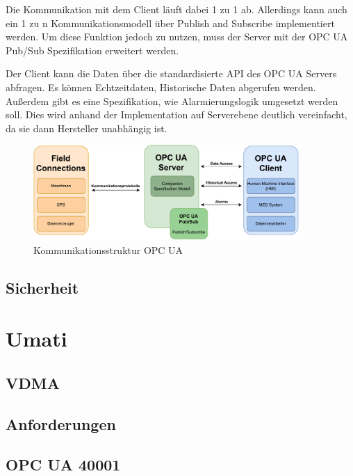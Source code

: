 \documentclass[a4paper, 12pt, oneside]{scrbook}
\begin{document}
		Die Kommunikation mit dem Client läuft dabei 1 zu 1 ab. Allerdings kann auch ein 1 zu n Kommunikationsmodell über Publish and Subscribe implementiert werden. Um diese Funktion jedoch zu nutzen, muss der Server mit der OPC UA Pub/Sub Spezifikation erweitert werden.
		
		Der Client kann die Daten über die standardisierte API des OPC UA Servers abfragen. Es können Echtzeitdaten, Historische Daten abgerufen werden. Außerdem gibt es eine Spezifikation, wie Alarmierungslogik umgesetzt werden soll. Dies wird anhand der Implementation auf Serverebene deutlich vereinfacht, da sie dann Hersteller unabhängig ist.
		
		\begin{figure}[h]
			\centering
			\includegraphics[width=0.9\textwidth]{res/diagramms/OPCUA.pdf}
			\caption{Kommunikationsstruktur OPC UA}
			\label{fig:OPCUA_Structure}
		\end{figure}
		
		\subsection{Sicherheit}
		
	
	\section{Umati}
	
	
		\subsection{VDMA}
		\subsection{Anforderungen}
		\subsection{OPC UA 40001}
		
\end{document}

